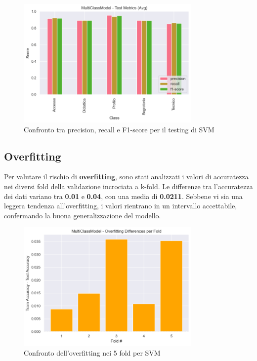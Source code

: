 \begin{figure}[H]
    \centering
    \includegraphics[width=0.8\textwidth]{images/metrics_test_svm.png}
    \caption{Confronto tra precision, recall e F1-score per il testing di SVM}
    \label{fig:metrics_test_svm}
\end{figure}

\subsection{Overfitting}

Per valutare il rischio di \textbf{overfitting}, sono stati analizzati i valori di accuratezza nei diversi fold della validazione incrociata a k-fold. Le differenze tra l'accuratezza dei dati variano tra \textbf{0.01} e \textbf{0.04}, con una media di \textbf{0.0211}. Sebbene vi sia una leggera tendenza all'overfitting, i valori rientrano in un intervallo accettabile, confermando la buona generalizzazione del modello.

\begin{figure}[H]
    \centering
    \includegraphics[width=0.8\textwidth]{images/overfitting_svm.png}
    \caption{Confronto dell'overfitting nei 5 fold per SVM}
    \label{fig:overfitting_svm}
\end{figure}

